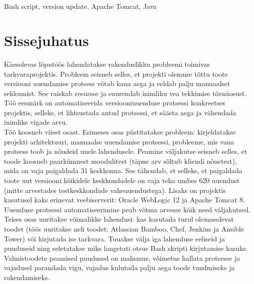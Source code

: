 \documentclass[12pt]{report}
\renewcommand{\headrulewidth}{0pt}
\begin{document}
  \\
  \vspace{2cm}

  \\
  Bash script, version update, Apache Tomcat, Java
  
  \newpage
 
  \tableofcontents
  \fancypagestyle{plain}{%
    \renewcommand{\headrulewidth}{0pt}%
    \fancyhf{}%
    \fancyfoot[R]{\thepage}%
}
 
  \newpage
  
  \section*{Sissejuhatus}
  \label{sissejuhatus}
  
  Käesolevas lõputöös lahendatakse rakenduslikku probleemi toimivas tarkvaraprojektis. Probleem seisneb selles, et projekti olemuse tõttu toote versiooni uuendamise protsess võtab kaua aega ja eeldab palju manuaalset sekkumist. See raiskab resursse ja suurendab inimliku vea tekkimise tõenäosust. Töö eesmärk on automatiseerida versiooniuuenduse protsessi konkreetses projektis, selleks, et lihtsustada antud protsessi, et säästa aega ja vähendada inimlike vigade arvu.\\
  
  Töö koosneb viiest osast. Esimeses osas püstitatakse probleem: kirjeldatakse projekti arhitektuuri, manuaalse uuendamise protsessi, probleeme, mis vana protsess toob ja nõudeid uuele lahendusele. Peamine väljakutse seisneb selles, et toode koosneb paarkümnest moodulitest (täpne arv sõltub kliendi nõuetest), mida on vaja paigaldada 31 keskkonna. See tähendab, et selleks, et paigaldada toote uut versiooni kõikidele keskkondadele on vaja teha umbes 620 uuendust (mitte arvestades testkeskkondade vaheuuendustega). Lisaks on projektis kasutusel kaks erinevat veebiserverit: Oracle WebLogic 12 ja Apache Tomcat 8. Uuenduse protsessi automatiseerimine peab võtma arvesse kõik need väljakutsed.\\
  
  Teises osas uuritakse võimalikke lahendusi: kas kasutada turul olemasolevat toodet (töös uuritakse neli toodet: Atlassian Bamboo, Chef, Jenkins ja Ansible Tower) või kirjutada ise tarkvara. Tuuakse välja iga lahenduse eeliseid ja puuduseid ning seletatakse miks langetati otsus Bash skripti kirjutamise kasuks. Valmistoodete peamised puudused on maksmus, võimetus hallata protsesse ja vajadusel parandada vigu, vajadus kulutada palju aega toode tundmiseks ja rakendamiseks.\\
  
\end{document}
